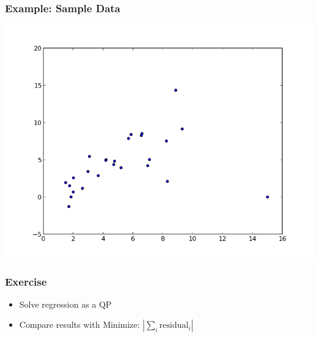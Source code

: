 \documentclass[12pt,handout]{beamer}
\begin{document}
\begin{frame}
\frametitle{Example: Sample Data}
\includegraphics[scale=0.5]{regression.png}
\end{frame}

{
\begin{frame}
  \frametitle{Exercise}
  \begin{itemize}
  \item Solve regression as a QP
  \item Compare results with Minimize: $|\sum_i \mbox{residual}_i|$
  \end{itemize}
\end{frame}
}
\end{document}
